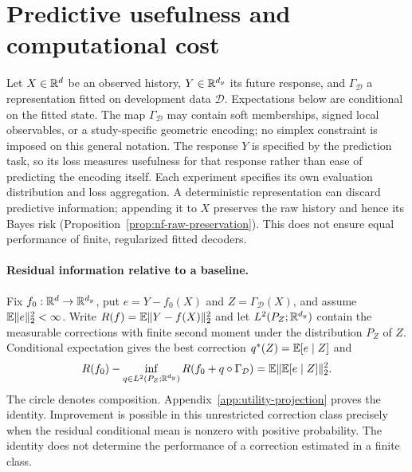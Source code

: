 \section{Predictive usefulness and computational cost}
\label{sec:utility-question}
Let $X\in\mathbb{R}^d$ be an observed history, $Y\in\mathbb{R}^{d_y}$ its future
response, and $\Gamma_{\mathcal D}$ a representation fitted on development
data $\mathcal D$. Expectations below are conditional on the fitted
state. The map $\Gamma_{\mathcal D}$ may contain soft memberships,
signed local observables, or a study-specific geometric encoding; no
simplex constraint is imposed on this general notation. The response
$Y$ is specified by the prediction task, so its loss measures usefulness
for that response rather than ease of predicting the encoding itself.
Each experiment specifies its own evaluation distribution and
loss aggregation. A deterministic representation can discard predictive
information; appending it to $X$ preserves the raw history and hence its
Bayes risk (Proposition~\ref{prop:nf-raw-preservation}). This does not
ensure equal performance of finite, regularized fitted decoders.

\paragraph{Residual information relative to a baseline.}
Fix $f_0:\mathbb{R}^d\to\mathbb{R}^{d_y}$, put $e=Y-f_0(X)$ and
$Z=\Gamma_{\mathcal D}(X)$, and assume $\mathbb{E}\|e\|_2^2<\infty$.
Write $R(f)=\mathbb{E}\|Y-f(X)\|_2^2$ and let
$L^2(P_Z;\mathbb{R}^{d_y})$ contain the measurable corrections with finite
second moment under the distribution $P_Z$ of $Z$. Conditional
expectation gives the best correction $q^*(Z)=\mathbb{E}[e\mid Z]$ and
\begin{equation}\label{eq:utility-oracle}
 R(f_0)-\inf_{q\in L^2(P_Z;\mathbb{R}^{d_y})}
 R(f_0+q\circ\Gamma_{\mathcal D})
 =\mathbb{E}\|\mathbb{E}[e\mid Z]\|_2^2.
\end{equation}
The circle denotes composition. Appendix~\ref{app:utility-projection}
proves the identity. Improvement is possible in this unrestricted
correction class precisely when the residual conditional mean is
nonzero with positive probability. The identity does not determine the
performance of a correction estimated in a finite class.

